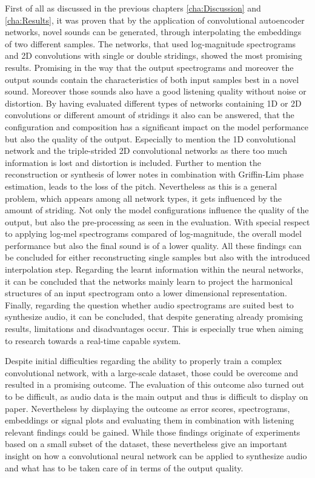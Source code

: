 First of all as discussed in the previous chapters \ref{cha:Discussion} and \ref{cha:Results}, it was proven that by the application of convolutional autoencoder networks, novel sounds can be generated, through interpolating the embeddings of two different samples. The networks, that used log-magnitude spectrograms and 2D convolutions with single or double stridings, showed the most promising results. Promising in the way that the output spectrograms and moreover the output sounds contain the characteristics of both input samples best in a novel sound. Moreover those sounds also have a good listening quality without noise or distortion. By having evaluated different types of networks containing 1D or 2D convolutions or different amount of stridings it also can be answered, that the configuration and composition has a significant impact on the model performance but also the quality of the output. Especially to mention the 1D convolutional network and the triple-strided 2D convolutional networks as there too much information is lost and distortion is included. Further to mention the reconstruction or synthesis of lower notes in combination with Griffin-Lim phase estimation, leads to the loss of the pitch. Nevertheless as this is a general problem, which appears among all network types, it gets influenced by the amount of striding. Not only the model configurations influence the quality of the output, but also the pre-processing as seen in the evaluation. With special respect to applying log-mel spectrograms compared of log-magnitude, the overall model performance but also the final sound is of a lower quality. All these findings can be concluded for either reconstructing single samples but also with the introduced interpolation step. Regarding the learnt information within the neural networks, it can be concluded that the networks mainly learn to project the harmonical structures of an input spectrogram onto a lower dimensional representation. Finally, regarding the question whether audio spectrograms are suited best to synthesize audio, it can be concluded, that despite generating already promising results, limitations and disadvantages occur. This is especially true when aiming to research towards a real-time capable system. 

Despite initial difficulties regarding the ability to properly train a complex convolutional network, with a large-scale dataset, those could be overcome and resulted in a promising outcome. The evaluation of this outcome also turned out to be difficult, as audio data is the main output and thus is difficult to display on paper. Nevertheless by displaying the outcome as error scores, spectrograms, embeddings or signal plots and evaluating them in combination with listening relevant findings could be gained. While those findings originate of experiments based on a small subset of the dataset, these nevertheless give an important insight on how a convolutional neural network can be applied to synthesize audio and what has to be taken care of in terms of the output quality.

